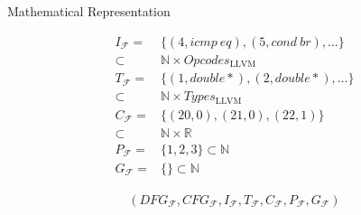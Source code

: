 \begin{blackbox}{Mathematical Representation}
\begin{minipage}{0.329\textwidth}
\begin{graybox}
            \vspace{4.36em}
        \end{graybox}
    \end{minipage}
    \begin{minipage}{0.329\textwidth}
        \centering
        \begin{graybox}
            \scriptsize
            \setlength{\abovedisplayskip}{0pt}
            \setlength{\belowdisplayskip}{0pt}
            \vspace{-0.5em}
            \begin{align*}
                I_\mathcal F={}&\{(4,icmp\ eq),(5,cond\ br),\dots\}\\[-0.5em]
                      \subset{}&\mathbb N\times Opcodes_\text{LLVM}\\[-0.25em]
                T_\mathcal F={}&\{(1,double*),(2,double*),\dots\}\\[-0.5em]
                      \subset{}&\mathbb N\times Types_\text{LLVM}\\[-0.25em]
                C_\mathcal F={}&\{(20,0),(21,0),(22,1)\}\\[-0.5em]
                      \subset{}&\mathbb N\times\mathbb R\\[-0.25em]
                P_\mathcal F={}&\{1,2,3\}\subset\mathbb N\\[-0.25em]
                G_\mathcal F={}&\{\}\subset\mathbb N
            \end{align*}

            \vspace{0.45em}
        \end{graybox}
    \end{minipage}

    \begin{minipage}{14.4cm}
        \begin{graybox}
            \setlength{\abovedisplayskip}{0pt}
            \setlength{\belowdisplayskip}{0pt}
            \vspace{-0.5em}
            \begin{align*}
                (DFG_\mathcal{F},
                 CFG_\mathcal{F},
                 I_\mathcal{F},
                 T_\mathcal{F},
                 C_\mathcal{F},
                 P_\mathcal{F},
                 G_\mathcal{F})
            \end{align*}
        \end{graybox}
    \end{minipage}
\end{blackbox}
